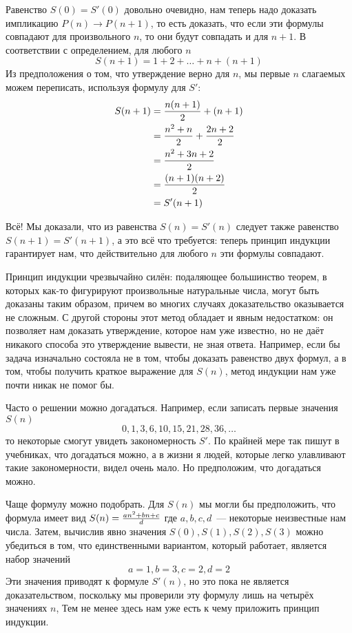 Равенство $S(0) = S'(0)$ довольно очевидно, нам теперь надо доказать импликацию $P(n)\to P(n + 1)$, то есть доказать, что если эти формулы совпадают для произвольного $n$, то они будут совпадать и для $n + 1$. В соответствии с определением, для любого $n$
$$S(n + 1) = 1 + 2 + \ldots + n + (n + 1)$$
Из предположения о том, что утверждение верно для $n$, мы первые $n$ слагаемых можем переписать, используя формулу для $S'$:
\begin{align*}
S(n + 1) &= {n(n + 1)\over 2} + (n + 1)\\
	&= {n^2 + n\over 2} + {2n + 2\over 2} \\
	&= {n^ 2 + 3n + 2 \over 2} \\
	&= {(n + 1)(n + 2)\over 2} \\
	&= {S'(n + 1)}
\end{align*}

Всё! Мы доказали, что из равенства $S(n)=S'(n)$ следует также равенство $S(n+1)=S'(n+1)$, а это всё что требуется: теперь принцип индукции гарантирует нам, что действительно для любого $n$ эти формулы совпадают.

Принцип индукции чрезвычайно силён: подаляющее большинство теорем, в которых как-то фигурируют произвольные натуральные числа, могут быть доказаны таким образом, причем во многих случаях доказательство оказывается не сложным. С другой стороны этот метод обладает и явным недостатком: он позволяет нам доказать утверждение, которое нам уже известно, но не даёт никакого способа это утверждение вывести, не зная ответа. Например, если бы задача изначально состояла не в том, чтобы доказать равенство двух формул, а в том, чтобы получить краткое выражение для $S(n)$, метод индукции нам уже почти никак не помог бы.

Часто о решении можно догадаться. Например, если записать первые значения $S(n)$
$$0, 1, 3, 6, 10, 15, 21, 28, 36, \ldots$$
то некоторые смогут увидеть закономерность $S'$. По крайней мере так пишут в учебниках, что догадаться можно, а в жизни я людей, которые легко улавливают такие закономерности, видел очень мало. Но предположим, что догадаться можно.

Чаще формулу можно подобрать. Для $S(n)$ мы могли бы предположить, что формула имеет вид
$S(n) = {an^2 + bn + c\over d}$
где $a, b, c, d$~--- некоторые неизвестные нам числа. Затем, вычислив явно значения $S(0), S(1), S(2), S(3)$ можно убедиться в том, что единственными вариантом, который работает, является набор значений
$$a=1, b=3, c=2, d=2$$
Эти значения приводят к формуле $S'(n)$, но это пока не является доказательством, поскольку мы проверили эту формулу лишь на четырёх значениях $n$, Тем не менее здесь нам уже есть к чему приложить принцип индукции.

